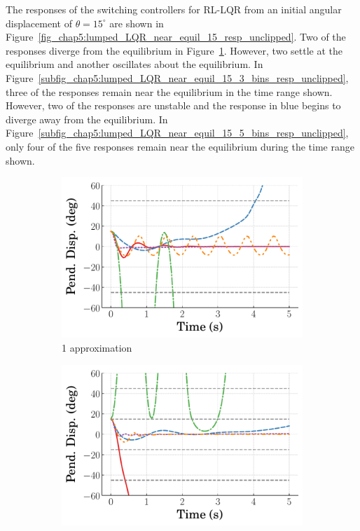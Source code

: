 The responses of the switching controllers for RL-LQR from an initial angular displacement of $\theta=15^\circ$ are shown in Figure~\ref{fig_chap5:lumped_LQR_near_equil_15_resp_unclipped}. Two of the responses diverge from the equilibrium in Figure~\ref{subfig_chap5:lumped_LQR_near_equil_15_1_bins_resp_unclipped}. However, two settle at the equilibrium and another oscillates about the equilibrium. In Figure~\ref{subfig_chap5:lumped_LQR_near_equil_15_3_bins_resp_unclipped}, three of the responses remain near the equilibrium in the time range shown. However, two of the responses are unstable and the response in blue begins to diverge away from the equilibrium. In Figure~\ref{subfig_chap5:lumped_LQR_near_equil_15_5_bins_resp_unclipped}, only four of the five responses remain near the equilibrium during the time range shown.
%
\begin{figure}[tb]
    \centering
    \begin{subfigure}[b]{0.32\textwidth}
        \centering
        \includegraphics[width=\textwidth]{figures/figures_Interpretability/Mean_ISE_Inverted_Pendulum-v0_cubic_1_bins_near_equil/Curve_fit_time_responses/lumped_lqr/curve_fit_Pend_Disp_15.pdf}
        \caption{1 approximation}
        \label{subfig_chap5:lumped_LQR_near_equil_15_1_bins_resp_unclipped}
    \end{subfigure}
    \hfill
    \begin{subfigure}[b]{0.32\textwidth}
        \centering
        \includegraphics[width=\textwidth]{figures/figures_Interpretability/Mean_ISE_Inverted_Pendulum-v0_cubic_3_bins_near_equil/Curve_fit_time_responses/lumped_lqr/curve_fit_Pend_Disp_15.pdf}

\end{subfigure}
\end{figure}
